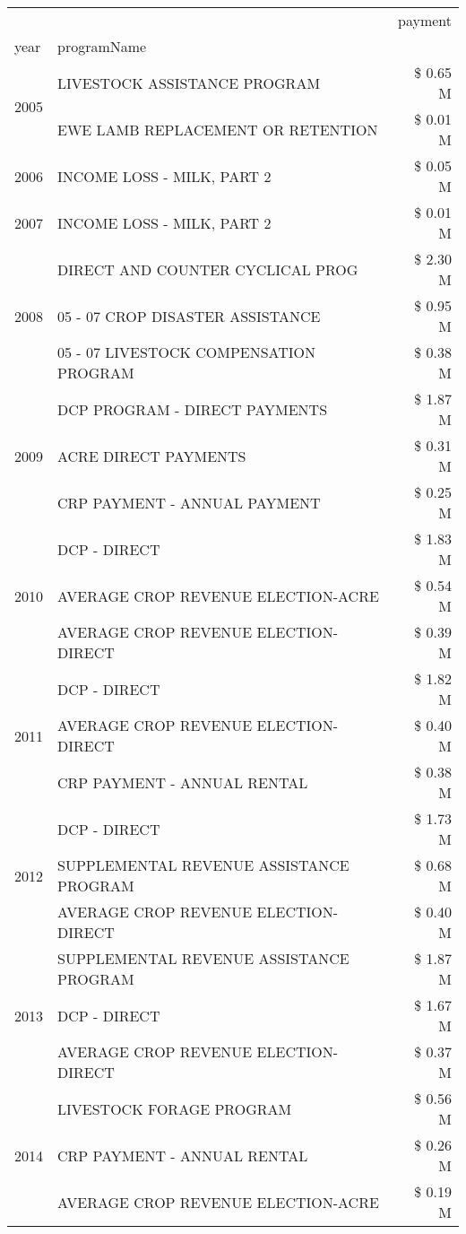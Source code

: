 \begin{tabular}{llr}
\toprule
 &  & payment \\
year & programName &  \\
\midrule
\multirow[t]{2}{*}{2005} & LIVESTOCK ASSISTANCE PROGRAM & \$ 0.65 M \\
 & EWE LAMB REPLACEMENT OR RETENTION & \$ 0.01 M \\
\cline{1-3}
2006 & INCOME LOSS - MILK, PART 2 & \$ 0.05 M \\
\cline{1-3}
2007 & INCOME LOSS - MILK, PART 2 & \$ 0.01 M \\
\cline{1-3}
\multirow[t]{3}{*}{2008} & DIRECT AND COUNTER CYCLICAL PROG & \$ 2.30 M \\
 & 05 - 07 CROP DISASTER ASSISTANCE & \$ 0.95 M \\
 & 05 - 07 LIVESTOCK COMPENSATION PROGRAM & \$ 0.38 M \\
\cline{1-3}
\multirow[t]{3}{*}{2009} & DCP PROGRAM - DIRECT PAYMENTS & \$ 1.87 M \\
 & ACRE DIRECT PAYMENTS & \$ 0.31 M \\
 & CRP PAYMENT - ANNUAL PAYMENT & \$ 0.25 M \\
\cline{1-3}
\multirow[t]{3}{*}{2010} & DCP - DIRECT & \$ 1.83 M \\
 & AVERAGE CROP REVENUE ELECTION-ACRE & \$ 0.54 M \\
 & AVERAGE CROP REVENUE ELECTION-DIRECT & \$ 0.39 M \\
\cline{1-3}
\multirow[t]{3}{*}{2011} & DCP - DIRECT & \$ 1.82 M \\
 & AVERAGE CROP REVENUE ELECTION-DIRECT & \$ 0.40 M \\
 & CRP PAYMENT - ANNUAL RENTAL & \$ 0.38 M \\
\cline{1-3}
\multirow[t]{3}{*}{2012} & DCP - DIRECT & \$ 1.73 M \\
 & SUPPLEMENTAL REVENUE ASSISTANCE PROGRAM & \$ 0.68 M \\
 & AVERAGE CROP REVENUE ELECTION-DIRECT & \$ 0.40 M \\
\cline{1-3}
\multirow[t]{3}{*}{2013} & SUPPLEMENTAL REVENUE ASSISTANCE PROGRAM & \$ 1.87 M \\
 & DCP - DIRECT & \$ 1.67 M \\
 & AVERAGE CROP REVENUE ELECTION-DIRECT & \$ 0.37 M \\
\cline{1-3}
\multirow[t]{3}{*}{2014} & LIVESTOCK FORAGE PROGRAM & \$ 0.56 M \\
 & CRP PAYMENT - ANNUAL RENTAL & \$ 0.26 M \\
 & AVERAGE CROP REVENUE ELECTION-ACRE & \$ 0.19 M \\

\end{tabular}
